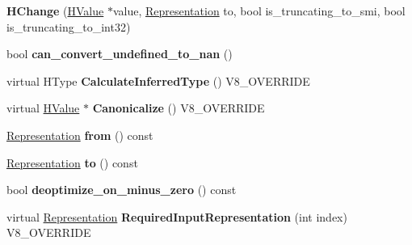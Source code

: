 \begin{DoxyCompactItemize}
\item 
\hypertarget{classv8_1_1internal_1_1_v8___f_i_n_a_l_a9fc8901a022bc17229212a8bd7bbe305}{}{\bfseries H\+Change} (\hyperlink{classv8_1_1internal_1_1_h_value}{H\+Value} $\ast$value, \hyperlink{classv8_1_1internal_1_1_representation}{Representation} to, bool is\+\_\+truncating\+\_\+to\+\_\+smi, bool is\+\_\+truncating\+\_\+to\+\_\+int32)\label{classv8_1_1internal_1_1_v8___f_i_n_a_l_a9fc8901a022bc17229212a8bd7bbe305}

\item 
\hypertarget{classv8_1_1internal_1_1_v8___f_i_n_a_l_af0c6a306738224f01e8a1feb431c3902}{}bool {\bfseries can\+\_\+convert\+\_\+undefined\+\_\+to\+\_\+nan} ()\label{classv8_1_1internal_1_1_v8___f_i_n_a_l_af0c6a306738224f01e8a1feb431c3902}

\item 
\hypertarget{classv8_1_1internal_1_1_v8___f_i_n_a_l_a7a6782b8660ab150601db2ff28262edd}{}virtual H\+Type {\bfseries Calculate\+Inferred\+Type} () V8\+\_\+\+O\+V\+E\+R\+R\+I\+D\+E\label{classv8_1_1internal_1_1_v8___f_i_n_a_l_a7a6782b8660ab150601db2ff28262edd}

\item 
\hypertarget{classv8_1_1internal_1_1_v8___f_i_n_a_l_aad5f871e0a6782c02e742ec017eca3cd}{}virtual \hyperlink{classv8_1_1internal_1_1_h_value}{H\+Value} $\ast$ {\bfseries Canonicalize} () V8\+\_\+\+O\+V\+E\+R\+R\+I\+D\+E\label{classv8_1_1internal_1_1_v8___f_i_n_a_l_aad5f871e0a6782c02e742ec017eca3cd}

\item 
\hypertarget{classv8_1_1internal_1_1_v8___f_i_n_a_l_a7ed04518e714dbc335985a6ef9e45220}{}\hyperlink{classv8_1_1internal_1_1_representation}{Representation} {\bfseries from} () const \label{classv8_1_1internal_1_1_v8___f_i_n_a_l_a7ed04518e714dbc335985a6ef9e45220}

\item 
\hypertarget{classv8_1_1internal_1_1_v8___f_i_n_a_l_ac2d6233539ca5c3382fa55e034968885}{}\hyperlink{classv8_1_1internal_1_1_representation}{Representation} {\bfseries to} () const \label{classv8_1_1internal_1_1_v8___f_i_n_a_l_ac2d6233539ca5c3382fa55e034968885}

\item 
\hypertarget{classv8_1_1internal_1_1_v8___f_i_n_a_l_ad6f10b70d21ca45b242dea915a6673e2}{}bool {\bfseries deoptimize\+\_\+on\+\_\+minus\+\_\+zero} () const \label{classv8_1_1internal_1_1_v8___f_i_n_a_l_ad6f10b70d21ca45b242dea915a6673e2}

\item 
\hypertarget{classv8_1_1internal_1_1_v8___f_i_n_a_l_a6c6d1f37f40b113d8f4062f1ffff7215}{}virtual \hyperlink{classv8_1_1internal_1_1_representation}{Representation} {\bfseries Required\+Input\+Representation} (int index) V8\+\_\+\+O\+V\+E\+R\+R\+I\+D\+E\label{classv8_1_1internal_1_1_v8___f_i_n_a_l_a6c6d1f37f40b113d8f4062f1ffff7215}


\end{DoxyCompactItemize}
